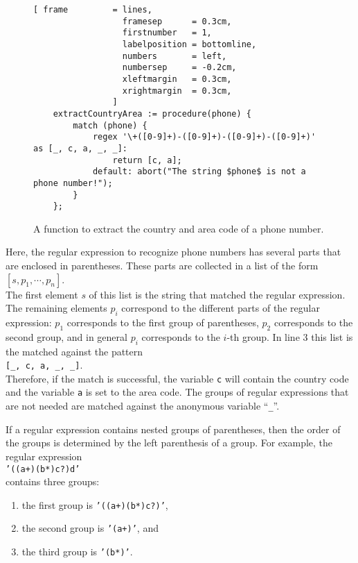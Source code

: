 \begin{figure}[!ht]
\centering
\begin{Verbatim}[ frame         = lines, 
                  framesep      = 0.3cm, 
                  firstnumber   = 1,
                  labelposition = bottomline,
                  numbers       = left,
                  numbersep     = -0.2cm,
                  xleftmargin   = 0.3cm,
                  xrightmargin  = 0.3cm,
                ]
    extractCountryArea := procedure(phone) {
        match (phone) {
            regex '\+([0-9]+)-([0-9]+)-([0-9]+)-([0-9]+)' as [_, c, a, _, _]:
                return [c, a];
            default: abort("The string $phone$ is not a phone number!");
        }
    };
\end{Verbatim}
\vspace*{-0.3cm}
\caption{A function to extract the country and area code of a phone number.}
\label{fig:extract-phone-code.stlx}
\end{figure}

\noindent
Here, the regular expression to recognize phone numbers has several parts that are
enclosed in parentheses.  These parts are collected in a list of the form
\\[0.2cm]
\hspace*{1.3cm}
$[s, p_1, \cdots, p_n]$.
\\[0.2cm]
The first element $s$ of this list is the string that matched the regular expression.  The
remaining elements $p_i$ correspond to the different parts of the regular expression: $p_1$
corresponds to the first group of parentheses, $p_2$ corresponds to the second group, and
in general $p_i$ corresponds to the $i$-th group.  In line 3 this list is the matched
against the pattern
\\[0.2cm]
\hspace*{1.3cm}
\texttt{[\_, c, a, \_, \_]}.
\\[0.2cm]
Therefore, if the match is successful, the variable \texttt{c} will contain the country
code and the variable \texttt{a} is set to the area code.  The groups of
regular expressions that are not needed are matched against the anonymous variable
``\texttt{\_}''. 

If a regular expression contains  nested groups of parentheses, then the order of
the groups is determined by the left parenthesis of a group.  For example, the regular
expression 
\\[0.2cm]
\hspace*{1.3cm}
\texttt{'((a+)(b*)c?)d'}
\\[0.2cm]
contains three groups:
\begin{enumerate}
\item the first group is \texttt{'((a+)(b*)c?)'},
\item the second group is \texttt{'(a+)'}, and
\item the third group is \texttt{'(b*)'}.
\end{enumerate}


